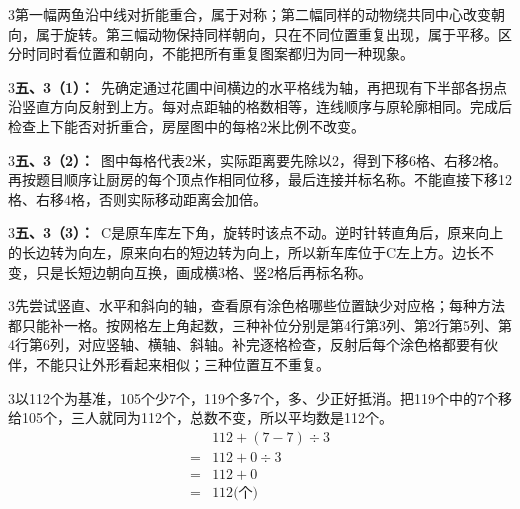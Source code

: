 \documentclass[multi=snippet,border={5bp 20bp 5bp 5bp}]{standalone}
\newenvironment{snippet}[3]{\begin{minipage}{#1bp}\color{answerred}\fontsize{#2}{#3}\selectfont\raggedright}{\end{minipage}}
\begin{document}
\begin{snippet}{505}{11.5}{14}\begin{multicols}{3}\raggedcolumns 第一幅两鱼沿中线对折能重合，属于对称；第二幅同样的动物绕共同中心改变朝向，属于旋转。第三幅动物保持同样朝向，只在不同位置重复出现，属于平移。区分时同时看位置和朝向，不能把所有重复图案都归为同一种现象。\end{multicols}\end{snippet}
\begin{snippet}{505}{11.5}{14}\begin{multicols}{3}\raggedcolumns \textbf{五、3（1）：}\ 先确定通过花圃中间横边的水平格线为轴，再把现有下半部各拐点沿竖直方向反射到上方。每对点距轴的格数相等，连线顺序与原轮廓相同。完成后检查上下能否对折重合，房屋图中的每格2米比例不改变。\end{multicols}\end{snippet}
\begin{snippet}{505}{11.5}{14}\begin{multicols}{3}\raggedcolumns \textbf{五、3（2）：}\ 图中每格代表2米，实际距离要先除以2，得到下移6格、右移2格。再按题目顺序让厨房的每个顶点作相同位移，最后连接并标名称。不能直接下移12格、右移4格，否则实际移动距离会加倍。\end{multicols}\end{snippet}
\begin{snippet}{505}{11.5}{14}\begin{multicols}{3}\raggedcolumns \textbf{五、3（3）：}\ C是原车库左下角，旋转时该点不动。逆时针转直角后，原来向上的长边转为向左，原来向右的短边转为向上，所以新车库位于C左上方。边长不变，只是长短边朝向互换，画成横3格、竖2格后再标名称。\end{multicols}\end{snippet}
\begin{snippet}{505}{11.5}{14}\begin{multicols}{3}\raggedcolumns 先尝试竖直、水平和斜向的轴，查看原有涂色格哪些位置缺少对应格；每种方法都只能补一格。按网格左上角起数，三种补位分别是第4行第3列、第2行第5列、第4行第6列，对应竖轴、横轴、斜轴。补完逐格检查，反射后每个涂色格都要有伙伴，不能只让外形看起来相似；三种位置互不重复。\end{multicols}\end{snippet}
\begin{snippet}{505}{11.5}{14}\begin{multicols}{3}\raggedcolumns 以112个为基准，105个少7个，119个多7个，多、少正好抵消。把119个中的7个移给105个，三人就同为112个，总数不变，所以平均数是112个。\[\begin{aligned}&112+(7-7)\div3\\={}&112+0\div3\\={}&112+0\\={}&112\text{(个)}\end{aligned}\]\end{multicols}\end{snippet}
\end{document}
